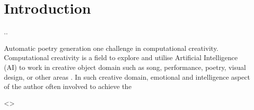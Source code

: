 \section{Introduction}

.. 

Automatic poetry generation one challenge  in computational creativity. Computational creativity is a field to explore and utilise Artificial Intelligence (AI) to work in creative object domain such as song, performance, poetry, visual design, or other areas \cite{colton2012computational}. In such creative domain, emotional and intelligence aspect of the author often involved to achieve the 


<>

